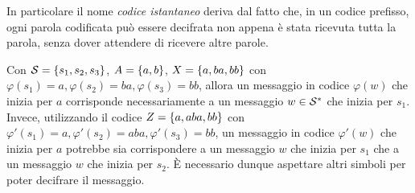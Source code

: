 In particolare il nome \emph{codice istantaneo} deriva dal fatto che, in un codice prefisso, ogni parola codificata può essere decifrata non appena è stata ricevuta tutta la parola, senza dover attendere di ricevere altre parole.

\begin{example}{}
  Con \(\SCal = \set{s_1,s_2,s_3}\), \(A = \set{a,b}\), \(X = \set{a,ba,bb}\) con \(\varphi(s_1) = a, \varphi(s_2) = ba, \varphi(s_3) = bb\), allora un messaggio in codice \(\varphi(w)\) che inizia per \(a\) corrisponde necessariamente a un messaggio \(w \in \mathcal{S}^*\) che inizia per \(s_1\).
  Invece, utilizzando il codice \(Z = \set{a,aba,bb}\) con \(\varphi'(s_1) = a, \varphi'(s_2) = aba, \varphi'(s_3) = bb\), un messaggio in codice \(\varphi'(w)\) che inizia per \(a\) potrebbe sia corrispondere a un messaggio \(w\) che inizia per \(s_1\) che a un messaggio \(w\) che inizia per \(s_2\).
  È necessario dunque aspettare altri simboli per poter decifrare il messaggio.
\end{example}